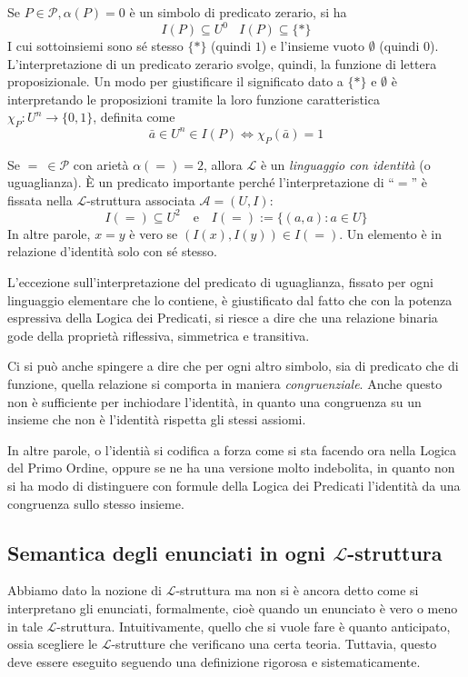 \begin{oss}
Se $P \in \mathscr{P}, \alpha(P) = 0$ è un simbolo di predicato zerario, si ha 
$$
I(P) \subseteq U^0 ~~~~ I(P) \subseteq \{*\}
$$
I cui sottoinsiemi sono sé stesso $\{*\}$ (quindi $1$) e l'insieme vuoto $\emptyset$ (quindi $0$). \\
L'interpretazione di un predicato zerario svolge, quindi, la funzione di lettera proposizionale. Un modo per giustificare il significato dato a $\{*\}$ e $\emptyset$ è interpretando le proposizioni tramite la loro funzione caratteristica $\chi_P: U^n \rightarrow \{0,1\}$, definita come 
$$
\bar{a} \in U^n \in I(P) \iff \chi_P(\bar{a}) = 1
$$
\end{oss}

\begin{oss}
Se $=\ \in \mathscr{P}$ con arietà $\alpha(=) = 2$, allora $\mathscr{L}$ è un \textit{linguaggio con identità} (o uguaglianza). È un predicato importante perché l'interpretazione di ``$=$'' è fissata nella $\mathscr{L}$-struttura associata $\mathscr{A}=(U,I)$:
$$
I(=) \subseteq U^2 ~~~ \text{ e } ~~~ I(=):= \{(a,a) : a \in U\}
$$
In altre parole, $x = y$ è vero se $(I(x), I(y)) \in I(=)$. Un elemento è in relazione d'identità solo con sé stesso.
\end{oss}

L'eccezione sull'interpretazione del predicato di uguaglianza, fissato per 
ogni linguaggio elementare che lo contiene, è giustificato dal fatto che con 
la potenza espressiva della Logica dei Predicati, si riesce a dire che una 
relazione binaria gode della proprietà riflessiva, simmetrica e transitiva.  

Ci si può anche spingere a dire che per ogni altro simbolo, sia di predicato 
che di funzione, quella relazione si comporta in maniera \textit{congruenziale}. 
Anche questo non è sufficiente per inchiodare l'identità, in quanto una congruenza 
su un insieme che non è l'identità rispetta gli stessi assiomi. 

In altre parole, o l'identià si codifica a forza come si sta facendo ora nella Logica del Primo Ordine, oppure se ne ha una versione molto indebolita, in quanto non si ha modo di distinguere con formule della Logica dei Predicati l'identità da una congruenza sullo stesso insieme.  

\subsection{Semantica degli enunciati in ogni $\mathscr{L}$-struttura}
Abbiamo dato la nozione di $\mathscr{L}$-struttura ma non si è ancora detto 
come si interpretano gli enunciati, formalmente, cioè quando un 
enunciato è vero o meno in tale $\mathscr{L}$-struttura. Intuitivamente, quello che 
si vuole fare è quanto anticipato, ossia scegliere le $\mathscr{L}$-strutture che 
verificano una certa teoria. Tuttavia, questo deve essere eseguito 
seguendo una definizione rigorosa e sistematicamente.


